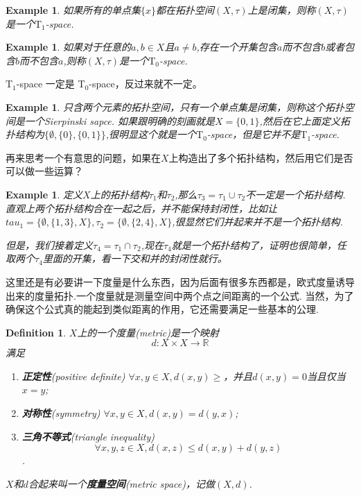 \documentclass{article}
\newtheorem{example}[theorem]{Example}
\newtheorem{definition}[theorem]{Definition}
\newcommand*{\xfunc}[4]{{#2}\colon{#3}{#1}{#4}}
\newcommand*{\func}[3]{\xfunc{\to}{#1}{#2}{#3}}
\begin{document}
\begin{example}
如果所有的单点集$\{x\}$都在拓扑空间$(X,\tau)$上是闭集，则称$(X,\tau)$是一个$\text{T}_1$-space.
\end{example}

\begin{example}
如果对于任意的$a,b \in X$且$a \neq b$,存在一个开集包含$a$而不包含$b$或者包含$b$而不包含$a$,则称$(X,\tau)$是一个$\text{T}_0$-space.
\end{example}

$\text{T}_1$-space 一定是 $\text{T}_0$-space，反过来就不一定。

\begin{example}
只含两个元素的拓扑空间，只有一个单点集是闭集，则称这个拓扑空间是一个Sierpinski sapce. 如果跟明确的刻画就是$X = \{0,1\}$,然后在它上面定义拓扑结构为$\{\emptyset,\{0\},\{0,1\}\}$,很明显这个就是一个$\text{T}_0$-space，但是它并不是$\text{T}_1$-space.
\end{example}

再来思考一个有意思的问题，如果在$X$上构造出了多个拓扑结构，然后用它们是否可以做一些运算？

\begin{example}
定义$X$上的拓扑结构$\tau_1$和$\tau_2$,那么$\tau_3 = \tau_1 \cup \tau_2$不一定是一个拓扑结构. 直观上两个拓扑结构合在一起之后，并不能保持封闭性，比如让$tau_1=\{\emptyset,\{1,3\},X\}, \tau_2 = \{\emptyset,\{2,4\},X\}$,很显然它们并起来并不是一个拓扑结构.

但是，我们接着定义$\tau_4 = \tau_1 \cap \tau_2$,现在$\tau_4$就是一个拓扑结构了，证明也很简单，任取两个$\tau_4$里面的开集，看一下交和并的封闭性就行。
\end{example}



这里还是有必要讲一下度量是什么东西，因为后面有很多东西都是，欧式度量诱导出来的度量拓扑.一个度量就是测量空间中两个点之间距离的一个公式. 当然，为了确保这个公式真的能起到类似距离的作用，它还需要满足一些基本的公理.

\begin{definition}
$X$上的一个度量(metric)是一个映射\[\func{d}{X \times X}{\mathbb{R}}\]满足
\begin{enumerate}
	\item \textbf{正定性}(positive definite) $\forall x,y \in X,d(x,y) \geq$，并且$d(x,y)=0$当且仅当$x=y$;
	\item \textbf{对称性}(symmetry) $\forall x,y \in X,d(x,y)=d(y,x)$;
	\item \textbf{三角不等式}(triangle inequality) \[\forall x,y,z \in X,d(x,z) \leq d(x,y)+d(y,z)\].
\end{enumerate}
$X$和$d$合起来叫一个\textbf{度量空间}(metric space)，记做$(X,d)$.
\end{definition}
\end{document}
